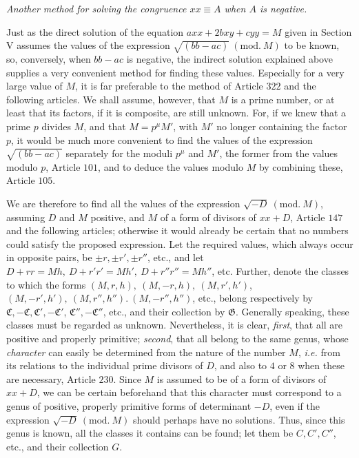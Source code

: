 \begin{center}\textit{Another method for solving the congruence \(xx\equiv A\) when \(A\) is negative.}\end{center}


Just as the direct solution of the equation \(axx+2bxy+cyy=M\) given in Section V assumes the values of the expression \(\surd{(bb-ac)}\ (\mathrm{mod.}\ M)\) to be known, so, conversely, when \(bb-ac\) is negative, the indirect solution explained above supplies a very convenient method for finding these values. Especially for a very large value of \(M\), it is far preferable to the method of Article \(322\) and the following articles. We shall assume, however, that \(M\) is a prime number, or at least that its factors, if it is composite,
are still unknown. For, if we knew that a prime \(p\) divides \(M\), and that \(M=p^\mu M'\), with \(M'\) no longer containing the factor \(p\), it would be much more convenient to find the values of the expression \(\surd{(bb-ac)}\) separately for the moduli \(p^\mu\) and \(M'\), the former from the values modulo \(p\), Article \(101\), and to deduce the values modulo \(M\) by combining these, Article \(105\).

We are therefore to find all the values of the expression \(\surd{-D}\ (\mathrm{mod.}\ M)\), assuming \(D\) and \(M\) positive, and \(M\) of a form of divisors of \(xx+D\), Article \(147\) and the following articles; otherwise it would already be certain that no numbers could satisfy the proposed expression. Let the required values, which always occur in opposite pairs, be \(\pm r,\allowbreak \pm r',\allowbreak \pm r''\), etc., and let \(D+rr=Mh,\allowbreak \ D+r'r'=Mh',\allowbreak \ D+r''r''=Mh''\), etc. Further, denote the classes to which the forms \((M,\allowbreak r,\allowbreak h),\allowbreak \ (M,\allowbreak -r,\allowbreak h),\allowbreak \ (M,\allowbreak r',\allowbreak h')\), \((M,\allowbreak -r',\allowbreak h'),\allowbreak \ (M,\allowbreak r'',\allowbreak h'').\ (M,\allowbreak -r'',\allowbreak h'')\), etc., belong respectively by \(\mathfrak C,\allowbreak -\mathfrak C,\allowbreak \mathfrak C',\allowbreak -\mathfrak C'\), \(\mathfrak C'',\allowbreak -\mathfrak C''\), etc., and their collection by \(\mathfrak G\). Generally speaking, these classes must be regarded as unknown. Nevertheless, it is clear, \textit{first}, that all are positive and properly primitive; \textit{second}, that all belong to the same genus, whose \textit{character} can easily be determined from the nature of the number \(M\), \textit{i.e.} from its relations to the individual prime divisors of \(D\), and also to \(4\) or \(8\) when these are necessary, Article \(230\). Since \(M\) is assumed to be of a form of divisors of \(xx+D\), we can be certain beforehand that this character must correspond to a genus of positive, properly primitive forms of determinant \(-D\), even if the expression \(\surd{-D}\ (\mathrm{mod.}\ M)\) should perhaps have no solutions. Thus, since this genus is known, all the classes it contains can be found; let them be \(C,\allowbreak C',\allowbreak C''\), etc., and their collection \(G\).

